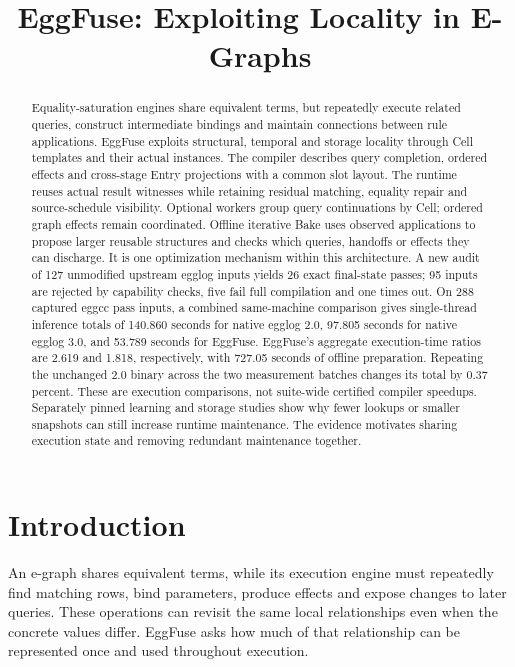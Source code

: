 \documentclass[10pt,letterpaper]{article}
\title{\bfseries EggFuse: Exploiting Locality in E-Graphs}
\date{}
\begin{document}
\maketitle
\begin{abstract}
Equality-saturation engines share equivalent terms, but repeatedly execute related queries, construct intermediate bindings and maintain connections between rule applications. EggFuse exploits structural, temporal and storage locality through Cell templates and their actual instances. The compiler describes query completion, ordered effects and cross-stage Entry projections with a common slot layout. The runtime reuses actual result witnesses while retaining residual matching, equality repair and source-schedule visibility. Optional workers group query continuations by Cell; ordered graph effects remain coordinated. Offline iterative Bake uses observed applications to propose larger reusable structures and checks which queries, handoffs or effects they can discharge. It is one optimization mechanism within this architecture. A new audit of 127 unmodified upstream egglog inputs yields 26 exact final-state passes; 95 inputs are rejected by capability checks, five fail full compilation and one times out. On 288 captured eggcc pass inputs, a combined same-machine comparison gives single-thread inference totals of 140.860 seconds for native egglog 2.0, 97.805 seconds for native egglog 3.0, and 53.789 seconds for EggFuse. EggFuse's aggregate execution-time ratios are 2.619 and 1.818, respectively, with 727.05 seconds of offline preparation. Repeating the unchanged 2.0 binary across the two measurement batches changes its total by 0.37 percent. These are execution comparisons, not suite-wide certified compiler speedups. Separately pinned learning and storage studies show why fewer lookups or smaller snapshots can still increase runtime maintenance. The evidence motivates sharing execution state and removing redundant maintenance together.
\end{abstract}

\section{Introduction}
An e-graph shares equivalent terms, while its execution engine must repeatedly
find matching rows, bind parameters, produce effects and expose changes to later
queries. These operations can revisit the same local relationships even when
the concrete values differ. EggFuse asks how much of that relationship can be
represented once and used throughout execution.
\end{document}
